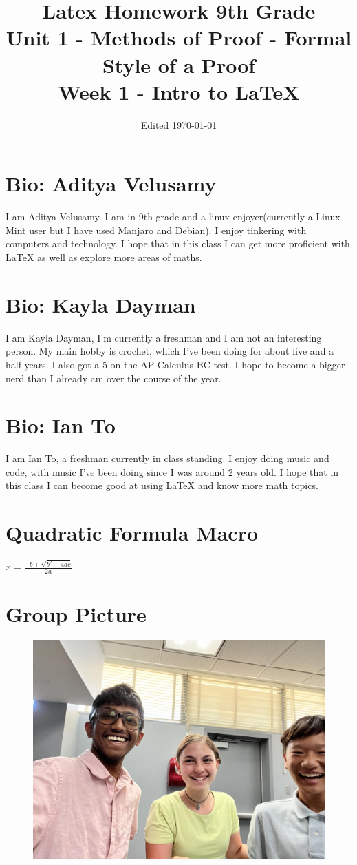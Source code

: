 \documentclass{article}
\title{Latex Homework 9th Grade\\ Unit 1 - Methods of Proof - Formal Style of a Proof\\ Week 1 - Intro to LaTeX}
\author{}
\date{Edited \today}
\newcommand{\quadform}{$x=\frac{-b\pm\sqrt{b^2-4ac}}{2a}$}
\begin{document}
\maketitle

\section{Bio: Aditya Velusamy}
I am Aditya Velusamy. I am in 9th grade and a linux enjoyer(currently a Linux Mint user but I have used Manjaro and Debian). I enjoy tinkering with computers and technology. I hope that in this class I can get more proficient with LaTeX as well as explore more areas of maths.
\section{Bio: Kayla Dayman}
I am Kayla Dayman, I'm currently a freshman and I am not an interesting person. My main hobby is crochet, which I've been doing for about five and a half years. I also got a 5 on the AP Calculus BC test. I hope to become a bigger nerd than I already am over the course of the year.
\section{Bio: Ian To}
I am Ian To, a freshman currently in class standing. I enjoy doing music and code, with music I've been doing since I was around 2 years old. I hope that in this class I can become
good at using LaTeX and know more math topics.
\section{Quadratic Formula Macro}
\quadform
\section{Group Picture}
\begin{figure}
\centering
\includegraphics[scale=0.2]{./IMG_1617.jpg}
\end{figure}
\end{document}
